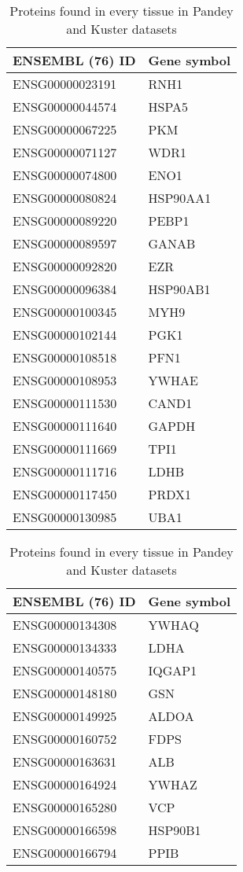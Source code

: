 \begin{table}[!htpb]
    \centering
    \caption{Proteins found in every tissue in Pandey and Kuster datasets}\label{tab:ubiProt2D}
    \begin{tabular}{ll}
        \toprule
        ENSEMBL (76) ID & Gene symbol \\
        \midrule
ENSG00000023191 & RNH1 \\
ENSG00000044574 & HSPA5 \\
ENSG00000067225 & PKM \\
ENSG00000071127 & WDR1 \\
ENSG00000074800 & ENO1 \\
ENSG00000080824 & HSP90AA1 \\
ENSG00000089220 & PEBP1 \\
ENSG00000089597 & GANAB \\
ENSG00000092820 & EZR \\
ENSG00000096384 & HSP90AB1 \\
ENSG00000100345 & MYH9 \\
ENSG00000102144 & PGK1 \\
ENSG00000108518 & PFN1 \\
ENSG00000108953 & YWHAE \\
ENSG00000111530 & CAND1 \\
ENSG00000111640 & GAPDH \\
ENSG00000111669 & TPI1 \\
ENSG00000111716 & LDHB \\
ENSG00000117450 & PRDX1 \\
ENSG00000130985 & UBA1 \\
\bottomrule
\end{tabular}%
\begin{tabular}{ll}
    \toprule
    ENSEMBL (76) ID & Gene symbol \\
    \midrule
ENSG00000134308 & YWHAQ \\
ENSG00000134333 & LDHA \\
ENSG00000140575 & IQGAP1 \\
ENSG00000148180 & GSN \\
ENSG00000149925 & ALDOA \\
ENSG00000160752 & FDPS \\
ENSG00000163631 & ALB \\
ENSG00000164924 & YWHAZ \\
ENSG00000165280 & VCP \\
ENSG00000166598 & HSP90B1 \\
ENSG00000166794 & PPIB \\

\end{tabular}
\end{table}
